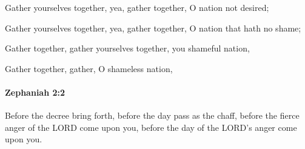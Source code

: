 			Gather yourselves together, yea, gather together, O nation not desired;

			\begin{versebox}
					\item[BHS] 
					\item[LXX] 
					\item[ASV] Gather yourselves together, yea, gather together, O nation that hath no shame;
					\item[NIV] Gather together, gather yourselves together, you shameful nation,
					\item[NRSV] Gather together, gather, O shameless nation,
			\end{versebox}

		\paragraph{Zephaniah 2:2} %
			\label{ZEPHANIAH-2-2}

			Before the decree bring forth, before the day pass as the chaff, before the fierce anger of the LORD come upon you, before the day of the LORD’s anger come upon you.

